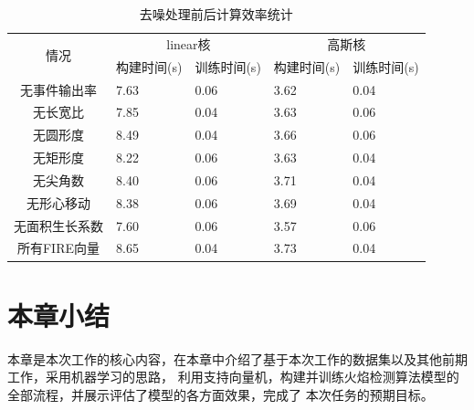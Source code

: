 \begin{table}[ht]
    \centering
    \caption{去噪处理前后计算效率统计}
    \begin{tabularx}{\textwidth}{c|X|X|X|X}
    \toprule
    \multicolumn{1}{c|}{\multirow{2}{*}{情况}} & \multicolumn{2}{c|}{linear核} & \multicolumn{2}{c}{高斯核} \\ \cmidrule(l){2-5} 
    \multicolumn{1}{c|}{}  & 构建时间(s)     & 训练时间(s)    & 构建时间(s)     & 训练时间(s)  \\
    \midrule
    无事件输出率      &7.63       &0.06       &3.62       &0.04\\
    无长宽比         &7.85       &0.04       &3.63       &0.06\\
    无圆形度         &8.49       &0.04       &3.66       &0.06\\
    无矩形度         &8.22       &0.06       &3.63       &0.04\\
    无尖角数         &8.40       &0.06       &3.71       &0.04\\
    无形心移动       &8.38       &0.06       &3.69       &0.04\\
    无面积生长系数    &7.60       &0.06       &3.57       &0.06\\
    所有FIRE向量     &8.65       &0.04       &3.73       &0.04\\
    \bottomrule
    \end{tabularx}
    \label{denoise_proficiency}
\end{table}

\section{本章小结}
本章是本次工作的核心内容，在本章中介绍了基于本次工作的数据集以及其他前期工作，采用机器学习的思路，
利用支持向量机，构建并训练火焰检测算法模型的全部流程，并展示评估了模型的各方面效果，完成了
本次任务的预期目标。
